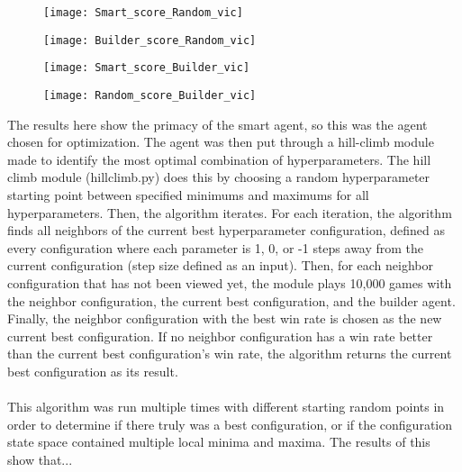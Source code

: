 \documentclass[a4paper, 11pt]{article}
\begin{document}
\begin{figure}
\centering
\begin{minipage}{.5\textwidth}
  \centering
  \texttt{[image: Smart\_score\_Random\_vic]}
  \label{fig:test1}
\end{minipage}%
\begin{minipage}{.5\textwidth}
  \centering
  \texttt{[image: Builder\_score\_Random\_vic]}
  \label{fig:test2}
\end{minipage}
\end{figure}

\begin{figure}
\centering
\begin{minipage}{.5\textwidth}
  \centering
  \texttt{[image: Smart\_score\_Builder\_vic]}
  \label{fig:test1}
\end{minipage}%
\begin{minipage}{.5\textwidth}
  \centering
  \texttt{[image: Random\_score\_Builder\_vic]}
  \label{fig:test2}
\end{minipage}
\end{figure}

\noindent The results here show the primacy of the smart agent, so this was the agent chosen for optimization. The agent was then put through a hill-climb module made to identify the most optimal combination of hyperparameters. The hill climb module (hillclimb.py) does this by choosing a random hyperparameter starting point between specified minimums and maximums for all hyperparameters. Then, the algorithm iterates. For each iteration, the algorithm finds all neighbors of the current best hyperparameter configuration, defined as every configuration where each parameter is 1, 0, or -1 steps away from the current configuration (step size defined as an input). Then, for each neighbor configuration that has not been viewed yet, the module plays 10,000 games with the neighbor configuration, the current best configuration, and the builder agent. Finally, the neighbor configuration with the best win rate is chosen as the new current best configuration. If no neighbor configuration has a win rate better than the current best configuration's win rate, the algorithm returns the current best configuration as its result.
\\ \\
\noindent This algorithm was run multiple times with different starting random points in order to determine if there truly was a best configuration, or if the configuration state space contained multiple local minima and maxima. The results of this show that...
\end{document}
